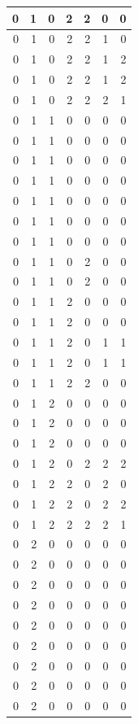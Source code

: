 \documentclass[
  12pt,
]{krantz}
\begin{document}
\begin{tabular}{r|r|r|r|r|r|r}
\hline
0 & 1 & 0 & 2 & 2 & 0 & 0\\
\hline
0 & 1 & 0 & 2 & 2 & 1 & 0\\
\hline
0 & 1 & 0 & 2 & 2 & 1 & 2\\
\hline
0 & 1 & 0 & 2 & 2 & 1 & 2\\
\hline
0 & 1 & 0 & 2 & 2 & 2 & 1\\
\hline
0 & 1 & 1 & 0 & 0 & 0 & 0\\
\hline
0 & 1 & 1 & 0 & 0 & 0 & 0\\
\hline
0 & 1 & 1 & 0 & 0 & 0 & 0\\
\hline
0 & 1 & 1 & 0 & 0 & 0 & 0\\
\hline
0 & 1 & 1 & 0 & 0 & 0 & 0\\
\hline
0 & 1 & 1 & 0 & 0 & 0 & 0\\
\hline
0 & 1 & 1 & 0 & 0 & 0 & 0\\
\hline
0 & 1 & 1 & 0 & 2 & 0 & 0\\
\hline
0 & 1 & 1 & 0 & 2 & 0 & 0\\
\hline
0 & 1 & 1 & 2 & 0 & 0 & 0\\
\hline
0 & 1 & 1 & 2 & 0 & 0 & 0\\
\hline
0 & 1 & 1 & 2 & 0 & 1 & 1\\
\hline
0 & 1 & 1 & 2 & 0 & 1 & 1\\
\hline
0 & 1 & 1 & 2 & 2 & 0 & 0\\
\hline
0 & 1 & 2 & 0 & 0 & 0 & 0\\
\hline
0 & 1 & 2 & 0 & 0 & 0 & 0\\
\hline
0 & 1 & 2 & 0 & 0 & 0 & 0\\
\hline
0 & 1 & 2 & 0 & 2 & 2 & 2\\
\hline
0 & 1 & 2 & 2 & 0 & 2 & 0\\
\hline
0 & 1 & 2 & 2 & 0 & 2 & 2\\
\hline
0 & 1 & 2 & 2 & 2 & 2 & 1\\
\hline
0 & 2 & 0 & 0 & 0 & 0 & 0\\
\hline
0 & 2 & 0 & 0 & 0 & 0 & 0\\
\hline
0 & 2 & 0 & 0 & 0 & 0 & 0\\
\hline
0 & 2 & 0 & 0 & 0 & 0 & 0\\
\hline
0 & 2 & 0 & 0 & 0 & 0 & 0\\
\hline
0 & 2 & 0 & 0 & 0 & 0 & 0\\
\hline
0 & 2 & 0 & 0 & 0 & 0 & 0\\
\hline
0 & 2 & 0 & 0 & 0 & 0 & 0\\
\hline
0 & 2 & 0 & 0 & 0 & 0 & 0\\

\end{tabular}
\end{document}
